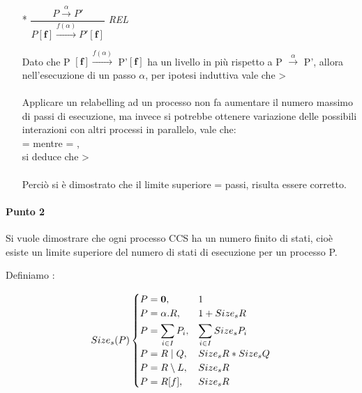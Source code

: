 \begin{itemize}
\begin{itemize}
		\item[*]
			$\dfrac{P \overset{\alpha}\rightarrow P'}{P \mathbf{[f]} \overset{f(\alpha)}\rightarrow P'\mathbf{[f]}}$ \textit{REL} 
			
			Dato che P $\mathbf{[f]} \overset{f(\alpha)}\rightarrow$ P'$\mathbf{[f]}$ ha un livello in più rispetto a P $\overset{\alpha}\rightarrow$ P', allora nell'esecuzione di un passo $\alpha$, per ipotesi induttiva vale che  >   \\
			\\
			Applicare un relabelling ad un processo non fa aumentare il numero massimo di passi di esecuzione, ma invece si potrebbe ottenere variazione delle possibili interazioni con altri processi in parallelo, vale che:\\  =  mentre  = ,\\ si deduce che  > \\
			\\
		Perciò si è dimostrato che il limite superiore  =  passi, risulta essere corretto.	
				
	\end{itemize}

	
\end{itemize}

\paragraph{Punto 2} \mbox{}

Si vuole dimostrare che ogni processo CCS ha un numero finito di stati, cioè esiste un limite superiore del numero di stati di esecuzione per un processo P.

Definiamo :

\[
Size_{s}(P)
\begin{cases}
P=\mathbf{0}, 			& 1							\\
P=\alpha.R,     & 1+Size_{s}{R}                \\
P=\displaystyle\sum_{i\in I}^{}P_{i},          & \displaystyle\sum_{i\in I}^{}Size_{s}{P_{i}} \\
P=R\mid Q,      & Size_{s}{R}*Size_{s}{Q}       \\
P=R\setminus L, & Size_{s}{R}                  \\
P=R[f],         & Size_{s}{R}
\end{cases}
\]

